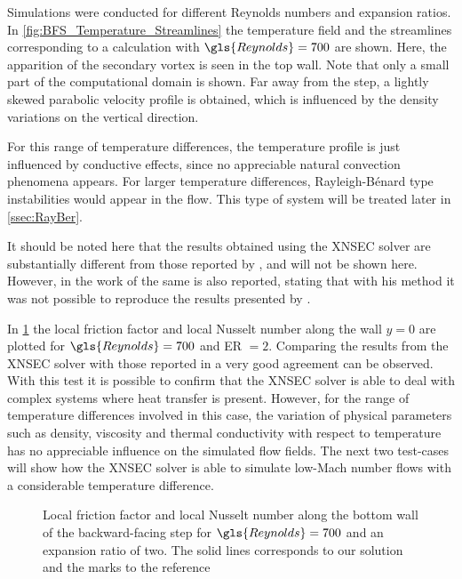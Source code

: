  Simulations were conducted for different Reynolds numbers and expansion ratios. In \cref{fig:BFS_Temperature_Streamlines} the temperature field and the streamlines corresponding to a calculation with $\gls{Reynolds} = 700$ are shown. Here, the apparition of the secondary vortex is seen in the top wall. Note that only a small part of the computational domain is shown. Far away from the step, a lightly skewed parabolic velocity profile is obtained, which is influenced by the density variations on the vertical direction.
 
 For this range of temperature differences, the temperature profile is just influenced by conductive effects, since no appreciable natural convection phenomena appears. For larger temperature differences, Rayleigh-Bénard type instabilities would appear in the flow. This type of system will be treated later in \cref{ssec:RayBer}.
 
It should be noted here that the results obtained using the XNSEC solver are substantially different from those reported by \textcite{xieFluidFlowHeat2016}, and will not be shown here. However, in the work of \textcite{henninkLowMachNumberFlow2022} the same is also reported, stating that with his method it was not possible to reproduce the results presented by \textcite{xieFluidFlowHeat2016}. 

In \cref{fig:fd_Nu_plot} the local friction factor and local Nusselt number along the wall $y = 0$ are plotted for $\gls{Reynolds} = 700$ and ER $= 2$. Comparing the results from the XNSEC solver with those reported in \textcite{henninkLowMachNumberFlow2022} a very good agreement can be observed.
With this test it is possible to confirm that the XNSEC solver is able to deal with complex systems where heat transfer is present. However, for the range of temperature differences involved in this case, the variation of physical parameters such as density, viscosity and thermal conductivity with respect to temperature has no appreciable influence on the simulated flow fields. The next two test-cases will show how the XNSEC solver is able to simulate low-Mach number flows with a considerable temperature difference.
\begin{figure}[tb]
	\caption[Local friction factor and local Nusselt number along the bottom wall of the backward-facing step for $\gls{Reynolds} = 700$ and an expansion ratio of two.]{Local friction factor and local Nusselt number along the bottom wall of the backward-facing step for $\gls{Reynolds} = 700$ and an expansion ratio of two. The solid lines corresponds to our solution and the marks to the reference \parencite{henninkLowMachNumberFlow2022}}
	\label{fig:fd_Nu_plot}
\end{figure}%
\FloatBarrier%